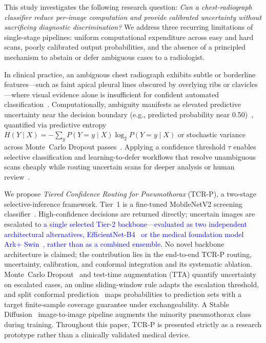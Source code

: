 \documentclass[diagnostics,article,submit,moreauthors]{Definitions/mdpi}
\newcommand{\rev}[1]{\textcolor{blue}{#1}}
\begin{document}
This study investigates the following research question: \textit{Can a chest-radiograph classifier reduce per-image computation and provide calibrated uncertainty without sacrificing diagnostic discrimination?} We address three recurring limitations of single-stage pipelines: uniform computational expenditure across easy and hard scans, poorly calibrated output probabilities, and the absence of a principled mechanism to abstain or defer ambiguous cases to a radiologist.

In clinical practice, an ambiguous chest radiograph exhibits subtle or borderline features---such as faint apical pleural lines obscured by overlying ribs or clavicles---where visual evidence alone is insufficient for confident automated classification~\cite{graham2023uncertainty}. Computationally, ambiguity manifests as elevated predictive uncertainty near the decision boundary (e.g., predicted probability near 0.50)~\cite{mozannar2020consistent}, quantified via predictive entropy $H(Y \mid X) = -\sum_{y} P(Y=y \mid X)\log_2 P(Y=y \mid X)$ or stochastic variance across Monte~Carlo Dropout passes~\cite{gal2016dropout, graham2023uncertainty}. Applying a confidence threshold $\tau$ enables selective classification and learning-to-defer workflows that resolve unambiguous scans cheaply while routing uncertain scans for deeper analysis or human review~\cite{mozannar2020consistent, geifman2017selective}.

We propose \emph{Tiered Confidence Routing for Pneumothorax} (TCR-P), a two-stage selective-inference framework. Tier~1 is a fine-tuned MobileNetV2 screening classifier~\cite{sandler2018mobilenetv2, sharma2025mobilenetv2}. High-confidence decisions are returned directly; uncertain images are escalated to \rev{a single selected Tier-2 backbone---evaluated as two independent architectural alternatives, EfficientNet-B4~\cite{tan2019efficientnet, chen2026efficientnet} or the medical foundation model Ark+ Swin~\cite{ma2025arkplus, liu2021swin}, rather than as a combined ensemble.} No novel backbone architecture is claimed; the contribution lies in the end-to-end TCR-P routing, uncertainty, calibration, and conformal integration and its systematic ablation. Monte~Carlo Dropout~\cite{gal2016dropout} and test-time augmentation (TTA) quantify uncertainty on escalated cases, an online sliding-window rule adapts the escalation threshold, and split conformal prediction~\cite{vovk2005algorithmic, shafer2008tutorial} maps probabilities to prediction sets with a target finite-sample coverage guarantee under exchangeability. A Stable Diffusion~\cite{rombach2022high} image-to-image pipeline augments the minority pneumothorax class during training. Throughout this paper, TCR-P is presented strictly as a research prototype rather than a clinically validated medical device.
\end{document}
